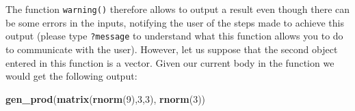 \documentclass[12pt,]{krantz}
\newenvironment{Shaded}{\begin{snugshade}}{\end{snugshade}}
\newcommand{\KeywordTok}[1]{\textcolor[rgb]{0.27,0.27,0.27}{\textbf{#1}}}
\newcommand{\DataTypeTok}[1]{\textcolor[rgb]{0.27,0.27,0.27}{#1}}
\newcommand{\DecValTok}[1]{\textcolor[rgb]{0.06,0.06,0.06}{#1}}
\newcommand{\StringTok}[1]{\textcolor[rgb]{0.5,0.5,0.5}{#1}}
\newcommand{\ControlFlowTok}[1]{\textcolor[rgb]{0.27,0.27,0.27}{\textbf{#1}}}
\newcommand{\OperatorTok}[1]{\textcolor[rgb]{0.43,0.43,0.43}{\textbf{#1}}}
\newcommand{\NormalTok}[1]{#1}
\begin{document}
\begin{Shaded}
\end{Shaded}

The function \texttt{warning()} therefore allows to output a result even
though there can be some errors in the inputs, notifying the user of the
steps made to achieve this output (please type \texttt{?message} to
understand what this function allows you to do to communicate with the
user). However, let us suppose that the second object entered in this
function is a vector. Given our current body in the function we would
get the following output:

\begin{Shaded}
\begin{Highlighting}[]
\KeywordTok{gen_prod}\NormalTok{(}\KeywordTok{matrix}\NormalTok{(}\KeywordTok{rnorm}\NormalTok{(}\DecValTok{9}\NormalTok{),}\DecValTok{3}\NormalTok{,}\DecValTok{3}\NormalTok{), }\KeywordTok{rnorm}\NormalTok{(}\DecValTok{3}\NormalTok{))}
\end{Highlighting}
\end{Shaded}
\end{document}
